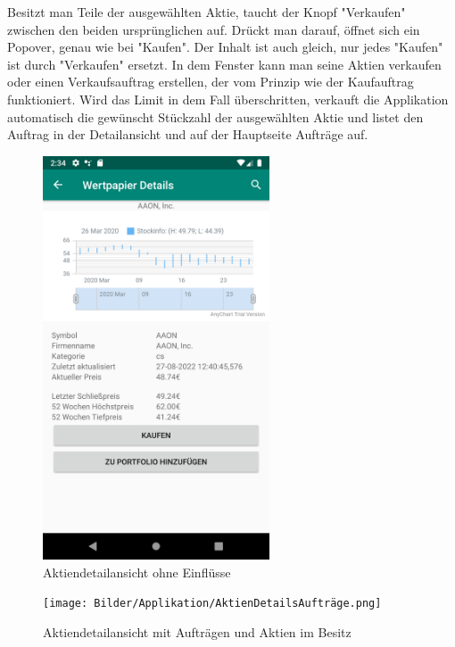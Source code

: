 \documentclass[10pt]{scrartcl}
\begin{document}
Besitzt man Teile der ausgewählten Aktie, taucht der Knopf "Verkaufen" zwischen den beiden ursprünglichen auf. Drückt man darauf, öffnet sich ein Popover, genau wie bei "Kaufen". Der Inhalt ist auch gleich, nur jedes "Kaufen" ist durch "Verkaufen" ersetzt. In dem Fenster kann man seine Aktien verkaufen oder einen Verkaufsauftrag erstellen, der vom Prinzip wie der Kaufauftrag funktioniert. Wird das Limit in dem Fall überschritten, verkauft die Applikation automatisch die gewünscht Stückzahl der ausgewählten Aktie und listet den Auftrag in der Detailansicht und auf der Hauptseite Aufträge auf.

\begin{figure}[H]
	\centering
	\includegraphics[width=0.6\textwidth]{Bilder/Applikation/AktienDetails.png}
	\caption{Aktiendetailansicht ohne Einflüsse}
\end{figure}

\begin{figure}[H]
	\centering
	\texttt{[image: Bilder/Applikation/AktienDetailsAufträge.png]}
	\caption{Aktiendetailansicht mit Aufträgen und Aktien im Besitz}
\end{figure}
\end{document}
